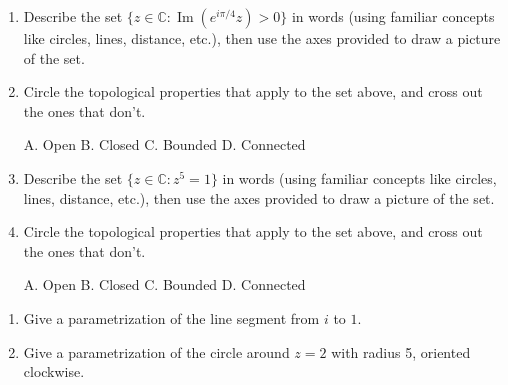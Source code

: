 \documentclass[11pt]{article}
\newcommand{\C}{\mathbb{C}}
\newcommand{\im}{\operatorname{Im}}
\begin{document}
\begin{enumerate}
\item Describe the set $\{z\in \C : \im \left( e^{i \pi/4} z \right) > 0 \}$ in words (using familiar concepts like circles, lines, distance, etc.), then use the axes provided to draw a picture of the set.  \\
\begin{flushright}
\end{flushright}


\item Circle the topological properties that apply to the set above, and cross out the ones that don't.
\begin{center}
A. Open \hspace*{0.4in} B. Closed \hspace*{0.4in} C. Bounded \hspace*{0.4in} D. Connected
\end{center}
\vspace*{0.15in}

\newpage
\item Describe the set $\{z \in \C : z^5 = 1 \}$ in words (using familiar concepts like circles, lines, distance, etc.), then use the axes provided to draw a picture of the set.  \\
\begin{flushright}
\end{flushright}


\item Circle the topological properties that apply to the set above, and cross out the ones that don't.
\begin{center}
A. Open \hspace*{0.4in} B. Closed \hspace*{0.4in} C. Bounded \hspace*{0.4in} D. Connected
\end{center}
\vspace*{0.25in}
\setcounter{enumCount}{\theenumi}
\end{enumerate}


\begin{enumerate}
\setcounter{enumi}{\theenumCount}
\item Give a parametrization of the line segment from $i$ to $1$.  
\vfill

\item Give a parametrization of the circle around $z = 2$ with radius 5, oriented clockwise. 
\vfill

\setcounter{enumCount}{\theenumi}
\end{enumerate}
\end{document}
